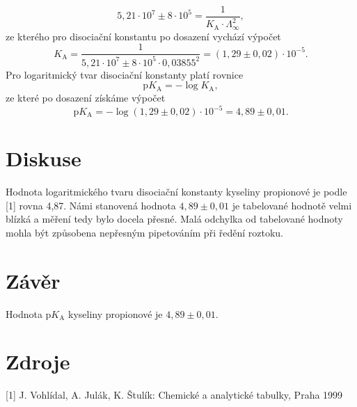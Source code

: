 \documentclass[12pt,a4paper]{article}
\def\ri#1{\mathrm{#1}}
\begin{document}
\begin{equation}
	5,21\cdot 10^7 \pm 8\cdot 10^5 = \dfrac{1}{K_\ri{A}\cdot \Lambda_\infty^2},
\end{equation}
ze kterého pro disociační konstantu po dosazení vychází výpočet
$$K_\ri{A} = \dfrac{1}{	5,21\cdot 10^7 \pm 8\cdot 10^5 \cdot 0,03855^2} = (1,29\pm 0,02)\cdot 10^{-5}.$$
Pro logaritmický tvar disociační konstanty platí rovnice
\begin{equation}
	\ri{p}K_\ri{A} = -\log K_\ri{A},
\end{equation}
ze které po dosazení získáme výpočet
$$\ri{p}K_\ri{A} = -\log (1,29\pm 0,02)\cdot 10^{-5} = 4,89\pm 0,01.$$
\section*{Diskuse}
Hodnota logaritmického tvaru disociační konstanty kyseliny propionové je podle [1] rovna 4,87. Námi stanovená hodnota $4,89\pm 0,01$ je tabelované hodnotě velmi blízká a měření tedy bylo docela přesné. Malá odchylka od tabelované hodnoty mohla být způsobena nepřesným pipetováním při ředění roztoku.
\section*{Závěr}
Hodnota p$K_\ri{A}$ kyseliny propionové je $4,89\pm 0,01$.
\section*{Zdroje}
[1] J. Vohlídal, A. Julák, K. Štulík: Chemické a analytické tabulky, Praha 1999
\end{document}

